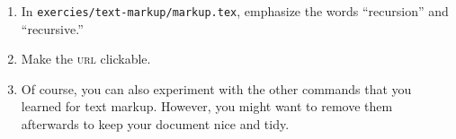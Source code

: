 \begin{enumerate}
  \item In \texttt{exercies/text-markup/markup.tex}, emphasize the words ``recursion'' and ``recursive.''
  \item Make the \textsc{url} clickable. 
  \item Of course, you can also experiment with the other commands that you learned for text markup. However, you might want to remove them afterwards to keep your document nice and tidy.
\end{enumerate}


